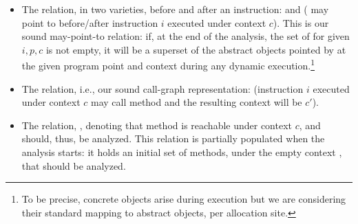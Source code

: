 \begin{itemize}
\item The  relation, in two varieties, before and after an instruction:  and  ( may point to  before/after instruction $i$ executed under context $c$). This is our sound may-point-to relation: if, at the end of the analysis, the set of  for given $i, p, c$ is not empty, it will be a superset of the abstract objects  pointed by  at the given program point and context during any dynamic execution.\footnote{To be precise, concrete objects arise during execution but we are considering their standard mapping to abstract objects, per allocation site.}

\item The  relation, i.e., our sound call-graph representation:  (instruction $i$ executed under context $c$ may call method  and the resulting context will be $c'$).

\item The  relation, , denoting that method  is reachable under context $c$, and should, thus, be analyzed. This relation is partially populated when the analysis starts: it holds an initial set of methods, under the empty context \ctxInit{}, that should be analyzed.
\end{itemize}


